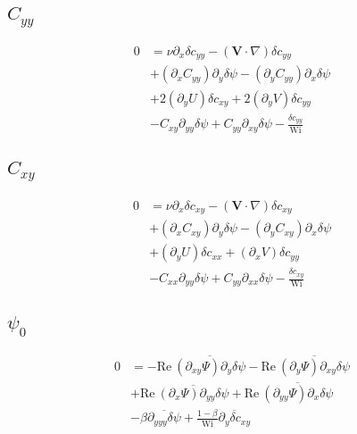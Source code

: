 \documentclass[12,a4paper]{article}
\newcommand{\dd}[1]{\partial_{#1}}
\newcommand{\scxx}{\delta c_{xx}}
\newcommand{\scyy}{\delta c_{yy}}
\newcommand{\scxy}{\delta c_{xy}}
\newcommand{\spsi}{\delta \psi}
\newcommand{\Wi}{\mathrm{Wi}}
\newcommand{\Rey}{\mathrm{Re \ }}
\begin{document}
\subsection{$C_{yy}$}

\begin{align}
    0 &= \nu \dd{x} \scyy - (\mathbf{V}\cdot \nabla) \scyy \nonumber \\
    &+ (\dd{x}C_{yy})\dd{y}\spsi - (\dd{y}C_{yy})\dd{x} \spsi \nonumber\\
    &+ 2(\dd{y}U)\scxy + 2(\dd{y}V)\scyy \nonumber \\
    &- C_{xy}\dd{yy}\spsi + C_{yy}\dd{xy} \spsi - \frac{\scyy}{\Wi} 
\end{align}

\subsection{$C_{xy}$}

\begin{align}
    0 &= \nu \dd{x} \scxy - (\mathbf{V}\cdot \nabla) \scxy \nonumber \\
    &+ (\dd{x}C_{xy})\dd{y}\spsi - (\dd{y}C_{xy})\dd{x} \spsi \nonumber\\
    &+ (\dd{y}U) \scxx + (\dd{x}V) \scyy \nonumber \\
    &- C_{xx}\dd{yy} \spsi + C_{yy} \dd{xx} \spsi - \frac{\scxy}{\Wi}
\end{align}

\subsection{$\psi_{0}$}

\begin{align}
    0 &= - \Rey\overline{(\dd{xy}\Psi) \dd{y}\spsi}  - \Rey\overline{(\dd{y}\Psi)\dd{xy}\spsi} \nonumber \\
    &+ \Rey\overline{(\dd{x}\Psi) \dd{yy}\spsi} + \Rey\overline{(\dd{yy}\Psi) \dd{x}\spsi } \nonumber \\
    &- \beta \overline{\dd{yyy}\spsi} + \frac{1-\beta}{\Wi} \overline{\dd{y}\scxy}
\end{align}
\end{document}

